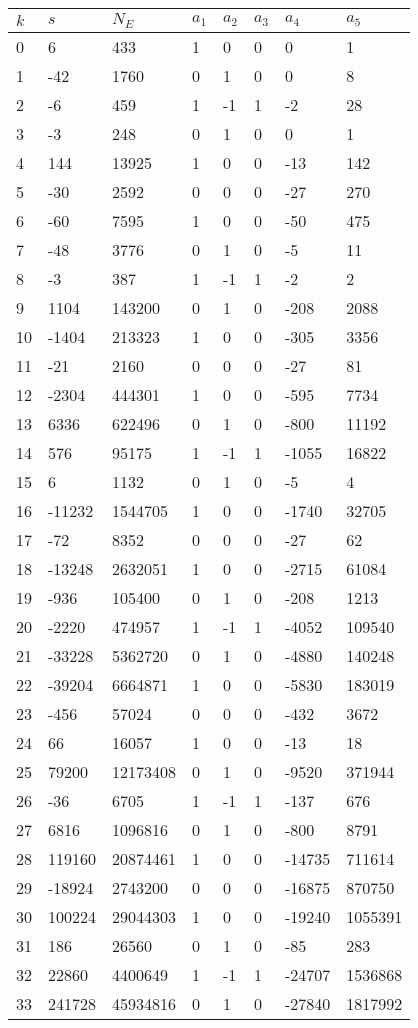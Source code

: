 \documentclass{amsart}
\begin{document}
\begin{longtable}{|l|l|l|lllll|}
\hline
$k$ & $s$ & $N_E$ & $a_1$ & $a_2$ & $a_3$ & $a_4$ & $a_5$\\
\hline
0&6&433&1&0&0&0&1\\
1&-42&1760&0&1&0&0&8\\
2&-6&459&1&-1&1&-2&28\\
3&-3&248&0&1&0&0&1\\
4&144&13925&1&0&0&-13&142\\
5&-30&2592&0&0&0&-27&270\\
6&-60&7595&1&0&0&-50&475\\
7&-48&3776&0&1&0&-5&11\\
8&-3&387&1&-1&1&-2&2\\
9&1104&143200&0&1&0&-208&2088\\
10&-1404&213323&1&0&0&-305&3356\\
11&-21&2160&0&0&0&-27&81\\
12&-2304&444301&1&0&0&-595&7734\\
13&6336&622496&0&1&0&-800&11192\\
14&576&95175&1&-1&1&-1055&16822\\
15&6&1132&0&1&0&-5&4\\
16&-11232&1544705&1&0&0&-1740&32705\\
17&-72&8352&0&0&0&-27&62\\
18&-13248&2632051&1&0&0&-2715&61084\\
19&-936&105400&0&1&0&-208&1213\\
20&-2220&474957&1&-1&1&-4052&109540\\
21&-33228&5362720&0&1&0&-4880&140248\\
22&-39204&6664871&1&0&0&-5830&183019\\
23&-456&57024&0&0&0&-432&3672\\
24&66&16057&1&0&0&-13&18\\
25&79200&12173408&0&1&0&-9520&371944\\
26&-36&6705&1&-1&1&-137&676\\
27&6816&1096816&0&1&0&-800&8791\\
28&119160&20874461&1&0&0&-14735&711614\\
29&-18924&2743200&0&0&0&-16875&870750\\
30&100224&29044303&1&0&0&-19240&1055391\\
31&186&26560&0&1&0&-85&283\\
32&22860&4400649&1&-1&1&-24707&1536868\\
33&241728&45934816&0&1&0&-27840&1817992\\

\end{longtable}
\end{document}
